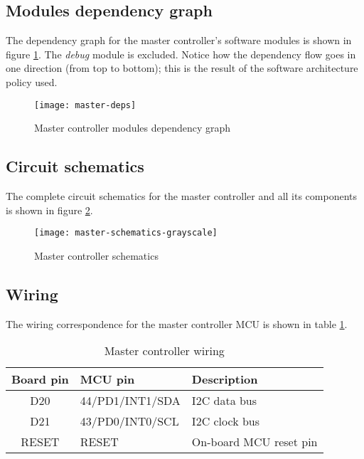 \subsection{Modules dependency graph}
The dependency graph for the master controller's software modules is shown in
figure \ref{img:master-deps-graph}. The \emph{debug} module is excluded. Notice
how the dependency flow goes in one direction (from top to bottom); this is the
result of the software architecture policy used.
\begin{figure}[hbp]
\begin{centering}
  \texttt{[image: master-deps]}
  \caption{Master controller modules dependency graph}
  \label{img:master-deps-graph}
\end{centering}
\end{figure}

\subsection{Circuit schematics}
The complete circuit schematics for the master controller and all its
components is shown in figure \ref{img:master-sch}.
\begin{figure}[hbp]
\begin{centering}
  \texttt{[image: master-schematics-grayscale]}
  \caption{Master controller schematics}
  \label{img:master-sch}
\end{centering}
\end{figure}

\subsection{Wiring}
The wiring correspondence for the master controller MCU is shown in table
\ref{tab:master-wiring}.
\begin{table}[hb]
  \begin{tabularx}{\textwidth}{c l X}
    \toprule
    Board pin & MCU pin & Description \\
    \midrule
    D20   & 44/PD1/INT1/SDA & I2C data bus \\
    D21   & 43/PD0/INT0/SCL & I2C clock bus \\
    RESET & RESET           & On-board MCU reset pin \\
    \bottomrule
  \end{tabularx}
  \caption{Master controller wiring}
  \label{tab:master-wiring}
\end{table}
